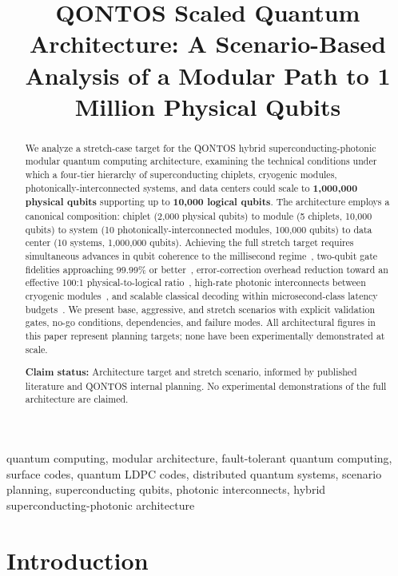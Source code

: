 \documentclass[conference]{IEEEtran}
\begin{document}
\title{QONTOS Scaled Quantum Architecture: A Scenario-Based Analysis of a Modular Path to 1 Million Physical Qubits}
\author{\qontosauthor}
\maketitle

\begin{abstract}
We analyze a stretch-case target for the QONTOS hybrid superconducting-photonic modular quantum computing architecture, examining the technical conditions under which a four-tier hierarchy of superconducting chiplets, cryogenic modules, photonically-interconnected systems, and data centers could scale to \textbf{1,000,000 physical qubits} supporting up to \textbf{10,000 logical qubits}. The architecture employs a canonical composition: chiplet (2,000 physical qubits) to module (5 chiplets, 10,000 qubits) to system (10 photonically-interconnected modules, 100,000 qubits) to data center (10 systems, 1,000,000 qubits). Achieving the full stretch target requires simultaneous advances in qubit coherence to the millisecond regime~\cite{bland2025}, two-qubit gate fidelities approaching 99.99\% or better~\cite{acharya2024}, error-correction overhead reduction toward an effective 100:1 physical-to-logical ratio~\cite{bravyi2024,googleqai2023}, high-rate photonic interconnects between cryogenic modules~\cite{monroe2014}, and scalable classical decoding within microsecond-class latency budgets~\cite{fowler2012}. We present base, aggressive, and stretch scenarios with explicit validation gates, no-go conditions, dependencies, and failure modes. All architectural figures in this paper represent planning targets; none have been experimentally demonstrated at scale.

\textbf{Claim status:} Architecture target and stretch scenario, informed by published literature and QONTOS internal planning. No experimental demonstrations of the full architecture are claimed.
\end{abstract}

\begin{IEEEkeywords}
quantum computing, modular architecture, fault-tolerant quantum computing, surface codes, quantum LDPC codes, distributed quantum systems, scenario planning, superconducting qubits, photonic interconnects, hybrid superconducting-photonic architecture
\end{IEEEkeywords}

\section{Introduction}
\end{document}
